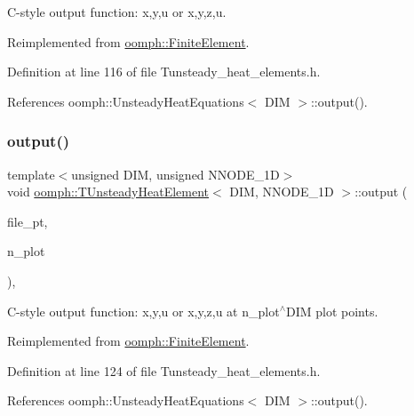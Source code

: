 C-\/style output function\+: x,y,u or x,y,z,u. 



Reimplemented from \hyperlink{classoomph_1_1FiniteElement_a72cddd09f8ddbee1a20a1ff404c6943e}{oomph\+::\+Finite\+Element}.



Definition at line 116 of file Tunsteady\+\_\+heat\+\_\+elements.\+h.



References oomph\+::\+Unsteady\+Heat\+Equations$<$ D\+I\+M $>$\+::output().

\mbox{\label{classoomph_1_1TUnsteadyHeatElement_ae557037d0c9eef1143aef52decb559ca}} 
\subsubsection{\texorpdfstring{output()}{output()}\hspace{0.1cm}{\footnotesize\ttfamily [4/4]}}
{\footnotesize\ttfamily template$<$unsigned D\+IM, unsigned N\+N\+O\+D\+E\+\_\+1D$>$ \\
void \hyperlink{classoomph_1_1TUnsteadyHeatElement}{oomph\+::\+T\+Unsteady\+Heat\+Element}$<$ D\+IM, N\+N\+O\+D\+E\+\_\+1D $>$\+::output (\begin{DoxyParamCaption}\item[{F\+I\+LE $\ast$}]{file\+\_\+pt,  }\item[{const unsigned \&}]{n\+\_\+plot }\end{DoxyParamCaption})\hspace{0.3cm}{\ttfamily [inline]}, {\ttfamily [virtual]}}



C-\/style output function\+: x,y,u or x,y,z,u at n\+\_\+plot$^\wedge$\+D\+IM plot points. 



Reimplemented from \hyperlink{classoomph_1_1FiniteElement_adfaee690bb0608f03320eeb9d110d48c}{oomph\+::\+Finite\+Element}.



Definition at line 124 of file Tunsteady\+\_\+heat\+\_\+elements.\+h.



References oomph\+::\+Unsteady\+Heat\+Equations$<$ D\+I\+M $>$\+::output().

